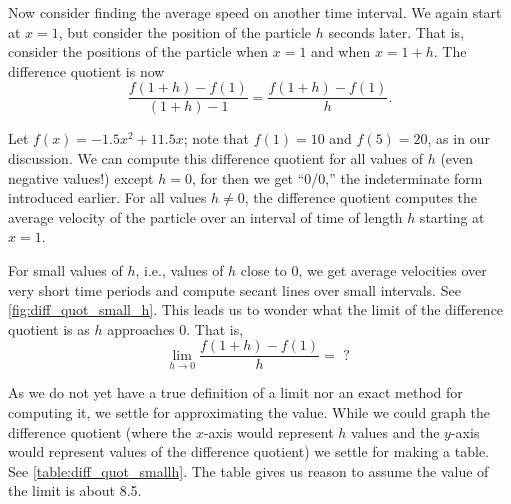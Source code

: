 Now consider finding the average speed on another time interval. We again start at $x=1$, but consider the position of the particle $h$ seconds later. That is, consider the positions of the particle when $x=1$ and when $x=1+h$. The difference quotient is now
\[\frac{f(1+h)-f(1)}{(1+h)-1} = \frac{f(1+h)-f(1)}h.\]

Let $f(x) = -1.5x^2+11.5x$; note that $f(1)=10$ and $f(5) = 20$, as in our discussion. We can compute this difference quotient for all values of $h$ (even negative values!) except $h=0$, for then we get ``0/0,'' the indeterminate form introduced earlier. For all values $h\neq 0$, the difference quotient computes the average velocity of the particle over an interval of time of length $h$ starting at $x=1$. 

For small values of $h$, i.e., values of $h$ close to 0, we get average velocities over very short time periods and compute secant lines over small intervals. See \autoref{fig:diff_quot_small_h}. This leads us to wonder what the limit of the difference quotient is as $h$ approaches 0. That is,
\[\lim_{h\to 0} \frac{f(1+h)-f(1)}{h} = \text{ ? }\]

As we do not yet have a true definition of a limit nor an exact method for computing it, we settle for approximating the value. While we could graph the difference quotient (where the $x$-axis would represent $h$ values and the $y$-axis would represent values of the difference quotient) we settle for making a table. See \autoref{table:diff_quot_smallh}. The table gives us reason to assume the value of the limit is about 8.5. \bigskip


%
%

